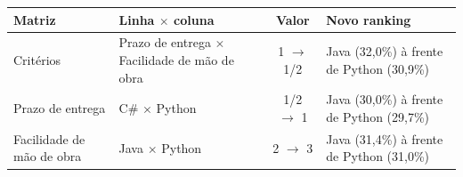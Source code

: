 \begin{tabular}{|>{\raggedright\arraybackslash}p{2.6cm}|>{\raggedright\arraybackslash}p{5.4cm}|c|>{\raggedright\arraybackslash}p{4.6cm}|}
\hline
\rowcolor{eapC}
\textbf{Matriz} & \textbf{Linha $\times$ coluna} & \textbf{Valor} & \textbf{Novo ranking} \\
\hline
Critérios & Prazo de entrega $\times$ Facilidade de mão de obra & 1 $\rightarrow$ 1/2 & Java (32,0\%) à frente de Python (30,9\%) \\
\hline
Prazo de entrega & C\# $\times$ Python & 1/2 $\rightarrow$ 1 & Java (30,0\%) à frente de Python (29,7\%) \\
\hline
Facilidade de mão de obra & Java $\times$ Python & 2 $\rightarrow$ 3 & Java (31,4\%) à frente de Python (31,0\%) \\
\hline
\end{tabular}
